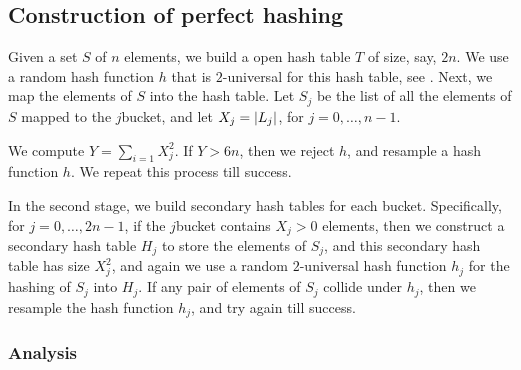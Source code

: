 \subsection{Construction of perfect hashing}

Given a set $S$ of $n$ elements, we build a open hash table $T$ of
size, say, $2n$. We use a random hash function $h$ that is
$2$-universal for this hash table, see . Next,
we map the elements of $S$ into the hash table.  Let $S_j$ be the list
of all the elements of $S$ mapped to the $j$\th bucket, and let
$X_j = \left| {L_j} \right|$, for $j=0,\ldots, n-1$.

We compute $Y = \sum_{i=1} X_j^2$. If $Y > 6n$, then we reject $h$,
and resample a hash function $h$. We repeat this process till success.

In the second stage, we build secondary hash tables for each bucket.
Specifically, for $j=0,\ldots, 2n-1$, if the $j$\th bucket contains
$X_j > 0$ elements, then we construct a secondary hash table $H_j$ to
store the elements of $S_j$, and this secondary hash table has size
$X_j^2$, and again we use a random $2$-universal hash function $h_j$
for the hashing of $S_j$ into $H_j$. If any pair of elements of $S_j$
collide under $h_j$, then we resample the hash function $h_j$, and try
again till success.

\subsubsection{Analysis}

